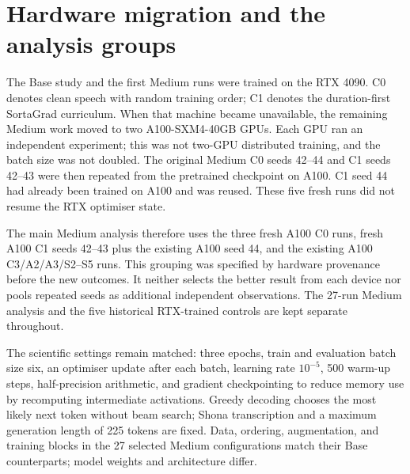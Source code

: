\documentclass[12pt,a4paper]{report}
\begin{document}
\section{Hardware migration and the analysis groups}
\label{sec:migration}

The Base study and the first Medium runs were trained on the RTX 4090.
C0 denotes clean speech with random training order; C1 denotes the
duration-first SortaGrad curriculum.
When that machine became unavailable, the remaining Medium work moved to two
A100-SXM4-40GB GPUs. Each GPU ran an independent experiment; this was not
two-GPU distributed training, and the batch size was not doubled. The original
Medium C0 seeds 42--44 and C1 seeds 42--43 were then repeated from the
pretrained checkpoint on A100. C1 seed 44 had already been trained on A100
and was reused. These five fresh runs did not resume the RTX optimiser state.

The main Medium analysis therefore uses the three fresh A100 C0 runs, fresh
A100 C1 seeds 42--43 plus the existing A100 seed 44, and the existing A100
C3/A2/A3/S2--S5 runs. This grouping was specified by hardware provenance
before the new outcomes. It neither selects the better result from each
device nor pools repeated seeds as additional independent observations.
The 27-run Medium analysis and the five historical RTX-trained controls are
kept separate throughout.

The scientific settings remain matched: three epochs, train and evaluation
batch size six, an optimiser update after each batch, learning rate $10^{-5}$,
500 warm-up steps, half-precision arithmetic, and gradient checkpointing
to reduce memory use by recomputing intermediate activations. Greedy decoding
chooses the most likely next token without beam search; Shona transcription
and a maximum generation length of 225 tokens are fixed. Data, ordering,
augmentation, and training blocks in the 27 selected Medium configurations
match their Base counterparts; model weights and architecture differ.
\end{document}
